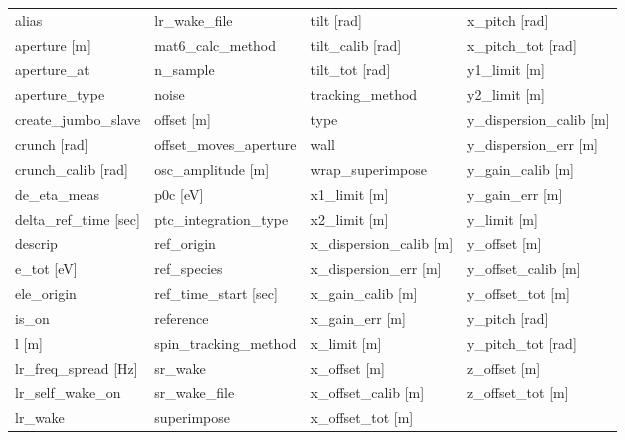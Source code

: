  \begin{tabular}{llll} \toprule
alias                            & lr_wake_file                     & tilt [rad]                       & x_pitch [rad]                    \\
aperture [m]                     & mat6_calc_method                 & tilt_calib [rad]                 & x_pitch_tot [rad]                \\
aperture_at                      & n_sample                         & tilt_tot [rad]                   & y1_limit [m]                     \\
aperture_type                    & noise                            & tracking_method                  & y2_limit [m]                     \\
create_jumbo_slave               & offset [m]                       & type                             & y_dispersion_calib [m]           \\
crunch [rad]                     & offset_moves_aperture            & wall                             & y_dispersion_err [m]             \\
crunch_calib [rad]               & osc_amplitude [m]                & wrap_superimpose                 & y_gain_calib [m]                 \\
de_eta_meas                      & p0c [eV]                         & x1_limit [m]                     & y_gain_err [m]                   \\
delta_ref_time [sec]             & ptc_integration_type             & x2_limit [m]                     & y_limit [m]                      \\
descrip                          & ref_origin                       & x_dispersion_calib [m]           & y_offset [m]                     \\
e_tot [eV]                       & ref_species                      & x_dispersion_err [m]             & y_offset_calib [m]               \\
ele_origin                       & ref_time_start [sec]             & x_gain_calib [m]                 & y_offset_tot [m]                 \\
is_on                            & reference                        & x_gain_err [m]                   & y_pitch [rad]                    \\
l [m]                            & spin_tracking_method             & x_limit [m]                      & y_pitch_tot [rad]                \\
lr_freq_spread [Hz]              & sr_wake                          & x_offset [m]                     & z_offset [m]                     \\
lr_self_wake_on                  & sr_wake_file                     & x_offset_calib [m]               & z_offset_tot [m]                 \\
lr_wake                          & superimpose                      & x_offset_tot [m]                 &                                  \\
 \bottomrule
 \end{tabular}
 \vfill
 
